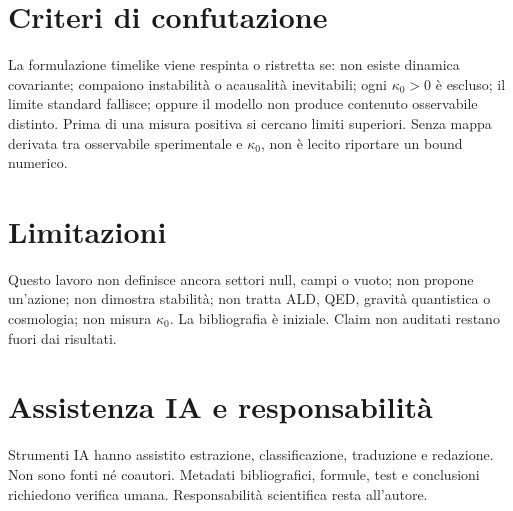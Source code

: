 \documentclass[11pt,a4paper]{article}
\begin{document}
\section{Criteri di confutazione}\label{sec:falsification}
La formulazione timelike viene respinta o ristretta se: non esiste dinamica covariante; compaiono instabilità o acausalità inevitabili; ogni $\kappa_0>0$ è escluso; il limite standard fallisce; oppure il modello non produce contenuto osservabile distinto. Prima di una misura positiva si cercano limiti superiori. Senza mappa derivata tra osservabile sperimentale e $\kappa_0$, non è lecito riportare un bound numerico.

\section{Limitazioni}\label{sec:limitations}
Questo lavoro non definisce ancora settori null, campi o vuoto; non propone un'azione; non dimostra stabilità; non tratta ALD, QED, gravità quantistica o cosmologia; non misura $\kappa_0$. La bibliografia è iniziale. Claim non auditati restano fuori dai risultati.

\section{Assistenza IA e responsabilità}\label{sec:ai}
Strumenti IA hanno assistito estrazione, classificazione, traduzione e redazione. Non sono fonti né coautori. Metadati bibliografici, formule, test e conclusioni richiedono verifica umana. Responsabilità scientifica resta all'autore.



\end{document}
